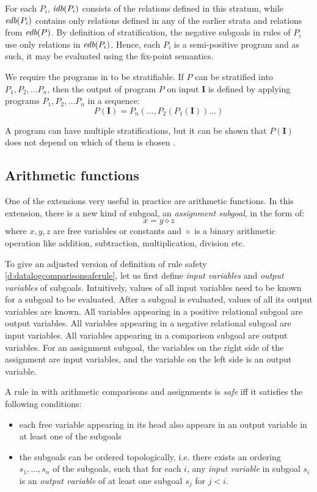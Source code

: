 For each $P_i$, $\textit{idb}(P_i)$ consists of the relations defined in this stratum, while $\textit{edb}(P_i)$ contains only relations defined in any of the earlier strata and relations from $\textit{edb}(P)$. By definition of stratification, the negative subgoals in rules of $P_i$ use only relations in $\textit{edb}(P_i)$. Hence, each $P_i$ is a semi-positive program and as such, it may be evaluated using the fix-point semantics.

We require the programs in \datalogneg to be stratifiable. If $P$ can be stratified into $P_1, P_2, \dots P_n$, then the output of program $P$ on input $\textbf{I}$ is defined by applying programs $P_1, P_2, \dots P_n$ in a sequence:
$$P(\textbf{I}) = P_n(\dots, P_2(P_1(\textbf{I}))\dots)$$

A program can have multiple stratifications, but it can be shown that $P(\textbf{I})$ does not depend on which of them is chosen \cite{fod}.

\subsection{Arithmetic functions}

One of the extensions very useful in practice are arithmetic functions. In this extension, there is a new kind of subgoal, an \emph{assignment subgoal}, in the form of:
$$x = y \diamond z$$
where $x, y, z$ are free variables or constants and $\diamond$ is a binary arithmetic operation like addition, subtraction, multiplication, division etc.

To give an adjusted version of definition of rule safety \ref{d:datalogcomparisonsaferule}, let us first define \emph{input variables} and \emph{output variables} of subgoals. Intuitively, values of all input variables need to be known for a subgoal to be evaluated. After a subgoal is evaluated, values of all its output variables are known. All variables appearing in a positive relational subgoal are output variables. All variables appearing in a negative relational subgoal are input variables. All variables appearing in a comparison subgoal are output variables. For an assignment subgoal, the variables on the right side of the assignment are input variables, and the variable on the left side is an output variable.

\begin{defn}\label{d:datalogeqsaferule}
A rule in \datalogneg with arithmetic comparisons and assignments is \emph{safe} iff it satisfies the following conditions:
\begin{itemize}
\item each free variable appearing in its head also appears in an output variable in at least one of the subgoals
\item the subgoals can be ordered topologically, i.e. there exists an ordering $s_1, \dots, s_n$ of the subgoals, such that for each $i$, any \emph{input variable} in subgoal $s_i$ is an \emph{output variable} of at least one subgoal $s_j$ for $j < i$. 
\end{itemize}
\end{defn}

